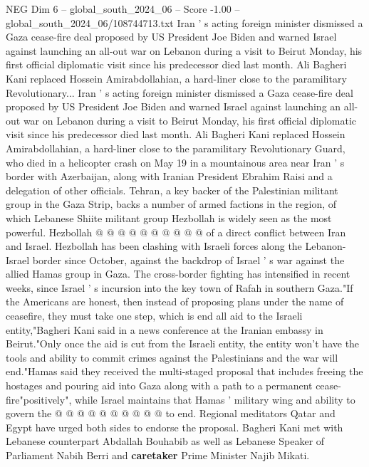 \begin{textsample}{NEG Dim 6 – global\_south\_2024\_06 – Score -1.00 – global\_south\_2024\_06/108744713.txt}  \label{ex:f6_neg_299}
Iran ' s acting foreign minister dismissed a Gaza cease-fire deal proposed by US President Joe Biden and warned Israel against launching an all-out war on Lebanon during a visit to Beirut Monday, his first official diplomatic visit since his predecessor died last month.
Ali Bagheri Kani replaced Hossein Amirabdollahian, a hard-liner close to the paramilitary Revolutionary...
Iran ' s acting foreign minister dismissed a Gaza cease-fire deal proposed by US President Joe Biden and warned Israel against launching an all-out war on Lebanon during a visit to Beirut Monday, his first official diplomatic visit since his predecessor died last month.
Ali Bagheri Kani replaced Hossein Amirabdollahian, a hard-liner close to the paramilitary Revolutionary Guard, who died in a helicopter crash on May 19 in a mountainous area near Iran ' s border with Azerbaijan, along with Iranian President Ebrahim Raisi and a delegation of other officials.
Tehran, a key backer of the Palestinian militant group in the Gaza Strip, backs a number of armed factions in the region, of which Lebanese Shiite militant group Hezbollah is widely seen as the most powerful.
Hezbollah @ @ @ @ @ @ @ @ @ @ of a direct conflict between Iran and Israel.
Hezbollah has been clashing with Israeli forces along the Lebanon-Israel border since October, against the backdrop of Israel ' s war against the allied Hamas group in Gaza.
The cross-border fighting has intensified in recent weeks, since Israel ' s incursion into the key town of Rafah in southern Gaza."If the Americans are honest, then instead of proposing plans under the name of ceasefire, they must take one step, which is end all aid to the Israeli entity,"Bagheri Kani said in a news conference at the Iranian embassy in Beirut."Only once the aid is cut from the Israeli entity, the entity won't have the tools and ability to commit crimes against the Palestinians and the war will end."Hamas said they received the multi-staged proposal that includes freeing the hostages and pouring aid into Gaza along with a path to a permanent cease-fire"positively", while Israel maintains that Hamas ' military wing and ability to govern the @ @ @ @ @ @ @ @ @ @ to end.
Regional meditators Qatar and Egypt have urged both sides to endorse the proposal.
Bagheri Kani met with Lebanese counterpart Abdallah Bouhabib as well as Lebanese Speaker of Parliament Nabih Berri and \textbf{caretaker} Prime Minister Najib Mikati.

\end{textsample}
